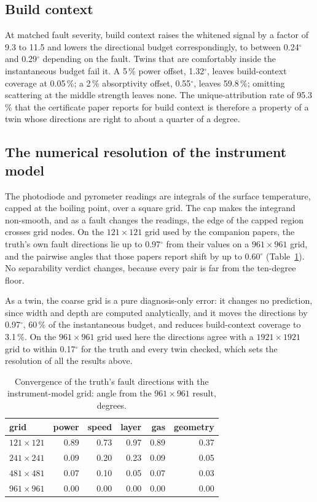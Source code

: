 \documentclass[preprint,12pt]{elsarticle}
\begin{document}
\subsection{Build context}
\label{sec:build}

At matched fault severity, build context raises the whitened signal by a factor
of 9.3 to 11.5 and lowers the directional budget correspondingly, to between
0.24$^\circ$ and 0.29$^\circ$ depending on the fault. Twins that are
comfortably inside the instantaneous budget fail it. A 5\,\% power offset,
1.32$^\circ$, leaves build-context coverage at 0.05\,\%; a 2\,\% absorptivity
offset, 0.55$^\circ$, leaves 59.8\,\%; omitting scattering at the middle strength
leaves none. The unique-attribution rate of 95.3\,\% that the certificate paper
reports for build context is therefore a property of a twin whose directions
are right to about a quarter of a degree.

\subsection{The numerical resolution of the instrument model}
\label{sec:grid}

The photodiode and pyrometer readings are integrals of the surface temperature,
capped at the boiling point, over a square grid. The cap makes the integrand
non-smooth, and as a fault changes the readings, the edge of the capped region
crosses grid nodes. On the $121\times121$ grid used by the companion papers,
the truth's own fault directions lie up to 0.97$^\circ$ from their values on
a $961\times961$ grid, and the pairwise angles that those papers report shift by
up to 0.60$^\circ$ (Table~\ref{tab:grid}). No separability verdict
changes, because every pair is far from the ten-degree floor.

As a twin, the coarse grid is a pure diagnosis-only error: it changes no
prediction, since width and depth are computed analytically, and it moves the
directions by 0.97$^\circ$, 60\,\% of the instantaneous budget, and reduces
build-context coverage to 3.1\,\%. On the $961\times961$ grid used here the
directions agree with a $1921\times1921$ grid to within 0.17$^\circ$ for
the truth and every twin checked, which sets the resolution of all the results
above.

\begin{table}[t]
\centering
\caption{Convergence of the truth's fault directions with the instrument-model
grid: angle from the $961\times961$ result, degrees.}
\label{tab:grid}
\small
\begin{tabular}{@{}lrrrrr@{}}
\toprule
grid & power & speed & layer & gas & geometry \\
\midrule
$121\times121$ & 0.89 & 0.73 & 0.97 & 0.89 & 0.37 \\
$241\times241$ & 0.09 & 0.20 & 0.23 & 0.09 & 0.05 \\
$481\times481$ & 0.07 & 0.10 & 0.05 & 0.07 & 0.03 \\
$961\times961$ & 0.00 & 0.00 & 0.00 & 0.00 & 0.00 \\
\bottomrule
\end{tabular}
\end{table}
\end{document}
